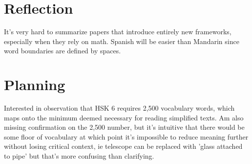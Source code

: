 \documentclass[
	letterpaper, %
]{jdf}
\begin{document}
\section{Reflection}
It's very hard to summarize papers that introduce entirely new frameworks, especially when they rely on math.
Spanish will be easier than Mandarin since word boundaries are defined by spaces.

\section{Planning}

Interested in observation that HSK 6 requires 2,500 vocabulary words, which maps onto the minimum deemed necessary for reading simplified texts. Am also missing confirmation on the 2,500 number, but it's intuitive that there would be some floor of vocabulary at which point it's impossible to reduce meaning further without losing critical context, ie telescope can be replaced with 'glass attached to pipe' but that's more confusing than clarifying.


\printbibliography{}
\end{document}
